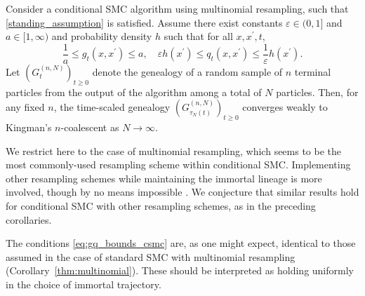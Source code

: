 \begin{corollary}\label{thm:CSMC}
Consider a conditional SMC algorithm using multinomial resampling, such that \ref{standing_assumption} is satisfied. Assume there exist constants $\varepsilon\in (0,1]$ and $a\in [1,\infty)$ and probability density $h$ such that for all $x, x^\prime, t$,
\begin{equation}\label{eq:gq_bounds_csmc}
\frac{1}{a} \leq g_t(x, x^\prime) \leq a , \quad
\varepsilon h(x^\prime) \leq q_t(x, x^\prime) \leq \frac{1}{\varepsilon} h(x^\prime) .
\end{equation}
Let $(G_t^{(n,N)})_{t\geq0}$ denote the genealogy of a random sample of $n$ terminal particles from the output of the algorithm among a total of $N$ particles. Then, for any fixed $n$, the time-scaled genealogy $(G_{\tau_N(t)}^{(n,N)})_{t\geq0}$ converges weakly to Kingman's $n$-coalescent as $N\to \infty$.%
\end{corollary}
We restrict here to the case of multinomial resampling, which seems to be the most commonly-used resampling scheme within conditional SMC. Implementing other resampling schemes while maintaining the immortal lineage is more involved, though by no means impossible \parencite[for details see][for example]{lee2019}.
We conjecture that similar results hold for conditional SMC with other resampling schemes, as in the preceding corollaries.

The conditions \eqref{eq:gq_bounds_csmc} are, as one might expect, identical to those assumed in the case of standard SMC with multinomial resampling (Corollary~\ref{thm:multinomial}).
These should be interpreted as holding uniformly in the choice of immortal trajectory.

